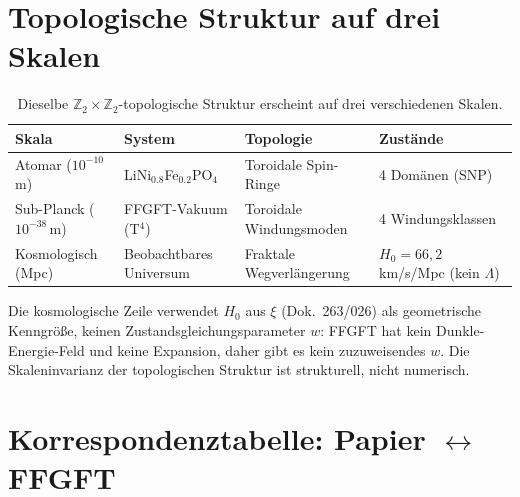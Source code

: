 \section{Topologische Struktur auf drei Skalen}

\begin{table}[htbp]
\centering
\caption{Dieselbe $\mathbb{Z}_2\times\mathbb{Z}_2$-topologische Struktur
erscheint auf drei verschiedenen Skalen.}
\label{tab:skalen}
\begin{tabular}{llll}
\toprule
\textbf{Skala} & \textbf{System} & \textbf{Topologie} & \textbf{Zustände} \\
\midrule
Atomar ($10^{-10}$\,m) &
  LiNi$_{0.8}$Fe$_{0.2}$PO$_4$ &
  Toroidale Spin-Ringe &
  4 Domänen (SNP) \\
Sub-Planck ($10^{-38}$\,m) &
  FFGFT-Vakuum (T$^4$) &
  Toroidale Windungsmoden &
  4 Windungsklassen \\
Kosmologisch (Mpc) &
  Beobachtbares Universum &
  Fraktale Wegverlängerung &
  $H_0 = 66{,}2$\,km/s/Mpc (kein $\Lambda$) \\
\bottomrule
\end{tabular}
\end{table}

\noindent Die kosmologische Zeile verwendet $H_0$ aus $\xi$ (Dok.~263/026)
als geometrische Kenngröße, keinen Zustandsgleichungsparameter $w$: FFGFT
hat kein Dunkle-Energie-Feld und keine Expansion, daher gibt es kein
zuzuweisendes $w$. Die Skaleninvarianz der topologischen Struktur ist
strukturell, nicht numerisch.

\section{Korrespondenztabelle: Papier $\leftrightarrow$ FFGFT}

